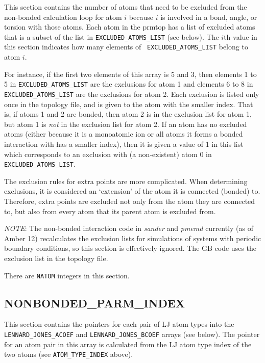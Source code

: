 This section contains the number of atoms that need to be excluded from the
non-bonded calculation loop for atom $i$ because $i$ is involved in a bond,
angle, or torsion with those atoms. Each atom in the prmtop has a list of
excluded atoms that is a subset of the list in {\tt EXCLUDED\_ATOMS\_LIST} (see
below). The $i$th value in this section indicates how many elements of {\tt
EXCLUDED\_ATOMS\_LIST} belong to atom $i$.

For instance, if the first two elements of this array is 5 and 3, then elements
1 to 5 in {\tt EXCLUDED\_ATOMS\_LIST} are the exclusions for atom 1 and elements
6 to 8 in {\tt EXCLUDED\_ATOMS\_LIST} are the exclusions for atom 2. Each
exclusion is listed only once in the topology file, and is given to the atom
with the smaller index. That is, if atoms 1 and 2 are bonded, then atom 2 is in
the exclusion list for atom 1, but atom 1 is \emph{not} in the exclusion list
for atom 2. If an atom has no excluded atoms (either because it is a monoatomic
ion or all atoms it forms a bonded interaction with has a smaller index), then
it is given a value of 1 in this list which corresponds to an exclusion with (a
non-existent) atom 0 in {\tt EXCLUDED\_ATOMS\_LIST}.

The exclusion rules for extra points are more complicated. When determining
exclusions, it is considered an `extension' of the atom it is connected (bonded)
to. Therefore, extra points are excluded not only from the atom they are
connected to, but also from every atom that its parent atom is excluded from.

\emph{NOTE}: The non-bonded interaction code in \emph{sander} and \emph{pmemd}
currently (as of Amber 12) recalculates the exclusion lists for simulations of
systems with periodic boundary conditions, so this section is effectively
ignored. The GB code uses the exclusion list in the topology file.


\noindent There are {\tt NATOM} integers in this section.

\subsection*{NONBONDED\_PARM\_INDEX}

This section contains the pointers for each pair of LJ atom types into the {\tt
LENNARD\_JONES\_ACOEF} and {\tt LENNARD\_JONES\_BCOEF} arrays (see below). The
pointer for an atom pair in this array is calculated from the LJ atom type index
of the two atoms (see {\tt ATOM\_TYPE\_INDEX} above).

